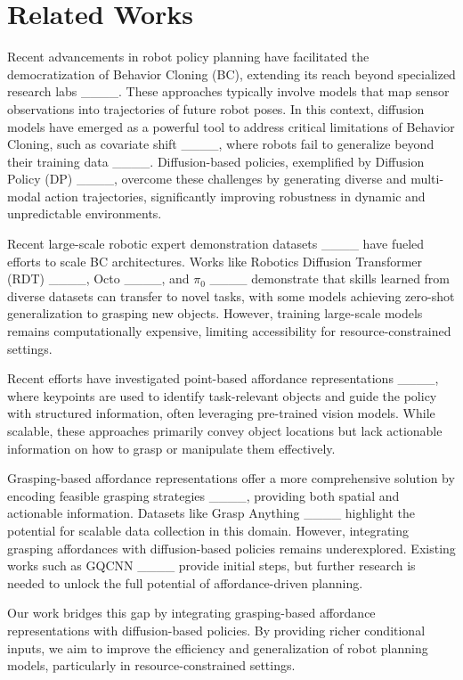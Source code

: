 \section{Related Works}
Recent advancements in robot policy planning have facilitated the democratization of Behavior Cloning (BC), extending its reach beyond specialized research labs ____. These approaches typically involve models that map sensor observations into trajectories of future robot poses. In this context, diffusion models have emerged as a powerful tool to address critical limitations of Behavior Cloning, such as covariate shift ____, where robots fail to generalize beyond their training data ____. Diffusion-based policies, exemplified by Diffusion Policy (DP) ____, overcome these challenges by generating diverse and multi-modal action trajectories, significantly improving robustness in dynamic and unpredictable environments.

Recent large-scale robotic expert demonstration datasets ____ have fueled efforts to scale BC architectures. Works like Robotics Diffusion Transformer (RDT) ____, Octo ____, and $\pi_0$ ____ demonstrate that skills learned from diverse datasets can transfer to novel tasks, with some models achieving zero-shot generalization to grasping new objects. However, training large-scale models remains computationally expensive, limiting accessibility for resource-constrained settings.

Recent efforts have investigated point-based affordance representations ____, where keypoints are used to identify task-relevant objects and guide the policy with structured information, often leveraging pre-trained vision models. While scalable, these approaches primarily convey object locations but lack actionable information on how to grasp or manipulate them effectively.

Grasping-based affordance representations offer a more comprehensive solution by encoding feasible grasping strategies ____, providing both spatial and actionable information. Datasets like Grasp Anything ____ highlight the potential for scalable data collection in this domain. However, integrating grasping affordances with diffusion-based policies remains underexplored. Existing works such as GQCNN ____ provide initial steps, but further research is needed to unlock the full potential of affordance-driven planning.

Our work bridges this gap by integrating grasping-based affordance representations with diffusion-based policies. By providing richer conditional inputs, we aim to improve the efficiency and generalization of robot planning models, particularly in resource-constrained settings.